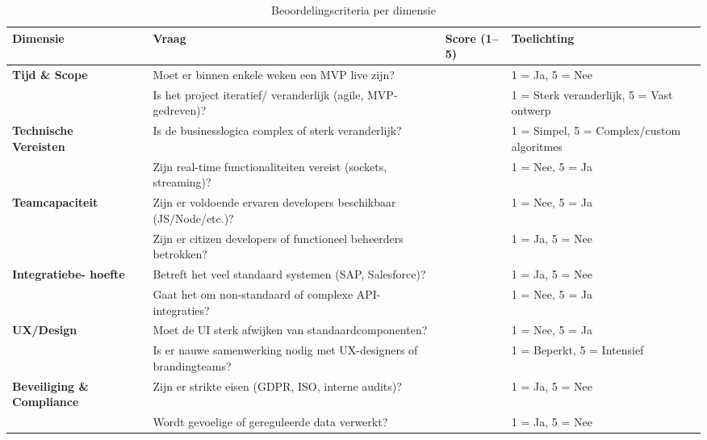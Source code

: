 \begin{table}[H]
    \centering
    \begin{tabular}{|p{3cm}|p{5cm}|p{2cm}|p{4cm}|}
        \hline
        \textbf{Dimensie} & \textbf{Vraag} & \textbf{Score (1–5)} & \textbf{Toelichting} \\
        \hline
        \textbf{Tijd \& Scope} & Moet er binnen enkele \newline weken een MVP live zijn? & & 1 = Ja, 5 = Nee \\
        \cline{2-4}
         & Is het project iteratief/ veranderlijk (agile, MVP-gedreven)? & & 1 = Sterk veranderlijk, 5 = Vast ontwerp \\
        \hline
        \textbf{Technische \newline Vereisten} & Is de businesslogica \newline complex of sterk veranderlijk? & & 1 = Simpel, 5 = \newline Complex/custom \newline algoritmes \\
        \cline{2-4}
         & Zijn real-time functionaliteiten vereist (sockets, streaming)? & & 1 = Nee, 5 = Ja \\
        \hline
        \textbf{Teamcapaciteit} & Zijn er voldoende ervaren developers beschikbaar (JS/Node/etc.)? & & 1 = Nee, 5 = Ja \\
        \cline{2-4}
         & Zijn er citizen developers of functioneel beheerders betrokken? & & 1 = Ja, 5 = Nee \\
        \hline
        \textbf{Integratiebe- hoefte} & Betreft het veel standaard systemen (SAP, \newline Salesforce)? & & 1 = Ja, 5 = Nee \\
        \cline{2-4}
         & Gaat het om non-standaard of complexe API-integraties? & & 1 = Nee, 5 = Ja \\
        \hline
        \textbf{UX/Design} & Moet de UI sterk afwijken van \newline standaardcomponenten? & & 1 = Nee, 5 = Ja \\
        \cline{2-4}
         & Is er nauwe \newline samenwerking nodig met UX-designers of brandingteams? & & 1 = Beperkt, 5 = \newline Intensief \\
        \hline
        \textbf{Beveiliging \& Compliance} & Zijn er strikte eisen (GDPR, ISO, interne audits)? & & 1 = Ja, 5 = Nee \\
        \cline{2-4}
         & Wordt gevoelige of gereguleerde data verwerkt? & & 1 = Ja, 5 = Nee \\
        \hline
    \end{tabular}
    \caption{Beoordelingscriteria per dimensie}
    \label{tab:beoordelingsvragen}
\end{table}

